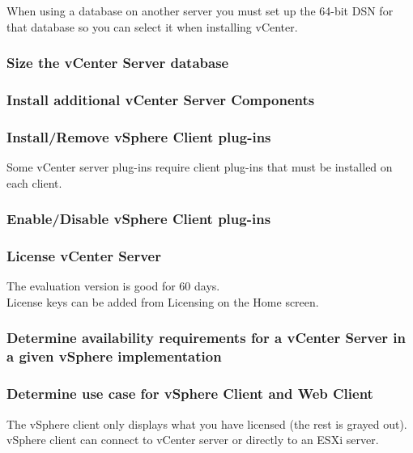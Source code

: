 When using a database on another server you must set up the 64-bit DSN for that database so you
can select it when installing vCenter.

\subsubsection{Size the vCenter Server database}

\subsubsection{Install additional vCenter Server Components}

\subsubsection{Install/Remove vSphere Client plug-ins}

Some vCenter server plug-ins require client plug-ins that must be installed
on each client.

\subsubsection{Enable/Disable vSphere Client plug-ins}

\subsubsection{License vCenter Server}

The evaluation version is good for 60 days.\\

License keys can be added from Licensing on the Home screen.

\subsubsection{Determine availability requirements for a vCenter Server in a given vSphere implementation}

\subsubsection{Determine use case for vSphere Client and Web Client}

The vSphere client only displays what you have licensed (the rest is grayed
out).\\

vSphere client can connect to vCenter server or directly to an ESXi server.\\

